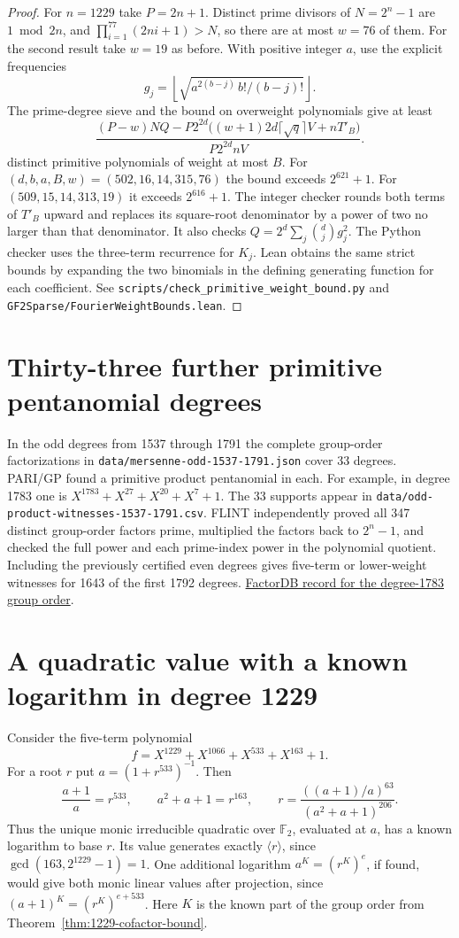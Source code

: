 \documentclass[11pt]{article}
\newcommand{\F}{\mathbb F_2}
\begin{document}
\begin{proof}
For \(n=1229\) take \(P=2n+1\). Distinct prime divisors of \(N=2^n-1\)
are \(1\bmod 2n\), and \(\prod_{i=1}^{77}(2ni+1)>N\), so there are at
most \(w=76\) of them. For the second result take \(w=19\) as before.
With positive integer \(a\), use the explicit frequencies
\[
 g_j=\left\lfloor\sqrt{a^{2(b-j)}\,b!/(b-j)!}\right\rfloor .
\]
The prime-degree sieve and the bound on overweight polynomials give
at least
\[
 \frac{(P-w)NQ-P2^{2d}\big((w+1)2d\lceil\sqrt q\rceil V+nT'_B\big)}
      {P2^{2d}nV}.
\]
distinct primitive polynomials of weight at most \(B\).
For \((d,b,a,B,w)=(502,16,14,315,76)\) the bound exceeds \(2^{621}+1\).
For \((509,15,14,313,19)\) it exceeds \(2^{616}+1\).
The integer checker rounds both terms of \(T'_B\) upward and replaces
its square-root denominator by a power of two no larger than that
denominator. It also checks \(Q=2^d\sum_j\binom dj g_j^2\).
The Python checker uses the three-term recurrence for \(K_j\).
Lean obtains the same strict bounds by expanding the two binomials
in the defining generating function for each coefficient.
See \nolinkurl{scripts/check_primitive_weight_bound.py} and
\nolinkurl{GF2Sparse/FourierWeightBounds.lean}.
\end{proof}

\section{Thirty-three further primitive pentanomial degrees}\label{sec:odd-1791}
In the odd degrees from 1537 through 1791 the complete group-order
factorizations in \nolinkurl{data/mersenne-odd-1537-1791.json} cover
33 degrees. PARI/GP found a primitive product pentanomial in each.
For example, in degree 1783 one is \(X^{1783}+X^{27}+X^{20}+X^7+1\).
The 33 supports appear in \nolinkurl{data/odd-product-witnesses-1537-1791.csv}.
FLINT independently proved all 347 distinct group-order factors
prime, multiplied the factors back to \(2^n-1\), and checked the
full power and each prime-index power in the polynomial quotient.
Including the previously certified even degrees gives five-term or
lower-weight witnesses for 1643 of the first 1792 degrees.
\href{https://factordb.com/index.php?query=2%5E1783-1}{FactorDB record
for the degree-1783 group order}.

\section{A quadratic value with a known logarithm in degree 1229}
\label{sec:sparse-quadratic-value}
Consider the five-term polynomial
\[
 f=X^{1229}+X^{1066}+X^{533}+X^{163}+1 .
\]
For a root \(r\) put \(a=(1+r^{533})^{-1}\). Then
\[
 \frac{a+1}{a}=r^{533},\qquad a^2+a+1=r^{163},\qquad
 r=\frac{((a+1)/a)^{63}}{(a^2+a+1)^{206}} .
\]
Thus the unique monic irreducible quadratic over \(\F\), evaluated at
\(a\), has a known logarithm to base \(r\). Its value generates exactly
\(\langle r\rangle\), since \(\gcd(163,2^{1229}-1)=1\).
One additional logarithm \(a^K=(r^K)^e\), if found, would give both
monic linear values after projection, since \((a+1)^K=(r^K)^{e+533}\).
Here \(K\) is the known part of the group order from
Theorem~\ref{thm:1229-cofactor-bound}.
\end{document}
